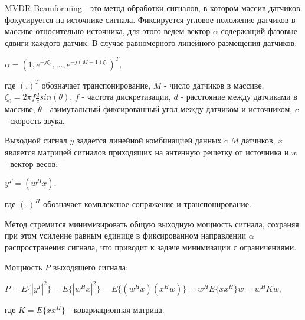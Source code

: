 \documentclass[a4paper,12pt]{report}
\begin{document}
	MVDR Beamforming - это метод обработки сигналов, в котором массив датчиков фокусируется на источнике сигнала. Фиксируется угловое положение датчиков в массиве относительно источника, для этого ведем вектор $\alpha$ содержащий фазовые сдвиги каждого датчик. В случае равномерного линейного размещения датчиков:
	\begin{center}
		$ \alpha = (1, e^{-j\zeta_0},..., e^{-j(M-1)\zeta_0})^T,$
	\end{center}
	где $(.)^T$ обозначает транспонирование, $M$ - число датчиков в массиве, $\zeta_0 = 2\pi f \frac{d}{c} sin(\theta)$, $f$ - частота дискретизации, $d$ - расстояние между датчиками в массиве, $\theta$ - азимутальный фиксированный угол между датчиком и источником, $c$ - скорость звука.
	
	Выходной сигнал $y$ задается линейной комбинацией данных c $M$ датчиков, $x$ является матрицей сигналов приходящих на антенную решетку от источника и $w$ - вектор весов: 
	\begin{center}
			$y^T = (w^Hx).$
	\end{center}
	где $(.)^H$ обозначает комплексное-сопряжение и транспонирование.
	 
  	Метод стремится минимизировать общую выходную мощность сигнала, сохраняя при этом усиление равным единице в фиксированном направлении $\alpha$ распространения сигнала, что приводит к задаче минимизации с ограничениями.
	
	Мощность $P$ выходящего сигнала:
	\begin{center}
		$P = E\{|y^T|^2\} = E\{|w^Hx|^2\} = E\{(w^Hx)(x^Hw)\} = w^HE\{xx^H\}w = w^HKw,$
	\end{center}
	где $K = E\{xx^H\}$ - ковариационная матрица.
	
\end{document}
